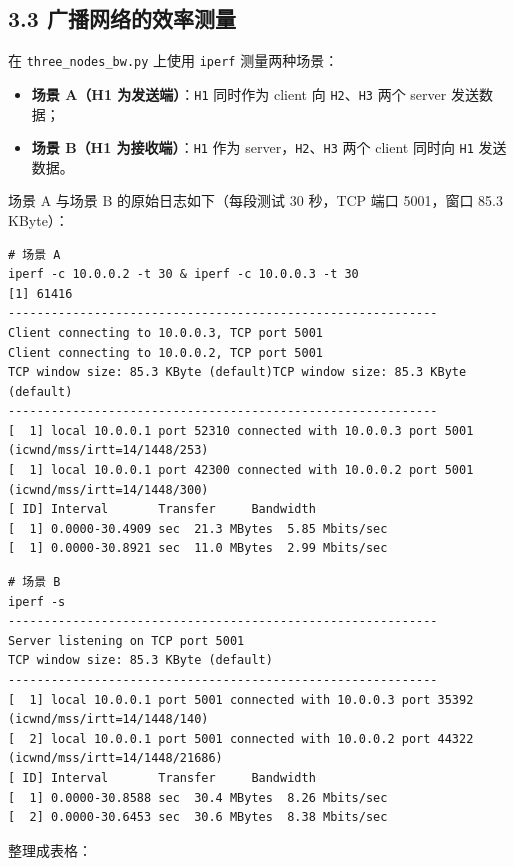 \documentclass[UTF8,12pt,a4paper,fontset=fandol]{ctexart}
\begin{document}
\subsection*{3.3 广播网络的效率测量}

在 \texttt{three_nodes_bw.py} 上使用 \texttt{iperf} 测量两种场景：

\begin{itemize}[leftmargin=1.7em]
  \item \textbf{场景 A（H1 为发送端）}：\texttt{H1} 同时作为 client 向 \texttt{H2}、\texttt{H3} 两个 server 发送数据；
  \item \textbf{场景 B（H1 为接收端）}：\texttt{H1} 作为 server，\texttt{H2}、\texttt{H3} 两个 client 同时向 \texttt{H1} 发送数据。
\end{itemize}

场景 A 与场景 B 的原始日志如下（每段测试 30 秒，TCP 端口 5001，窗口 85.3 KByte）：

\begin{verbatim}
# 场景 A
iperf -c 10.0.0.2 -t 30 & iperf -c 10.0.0.3 -t 30
[1] 61416
------------------------------------------------------------
Client connecting to 10.0.0.3, TCP port 5001
Client connecting to 10.0.0.2, TCP port 5001
TCP window size: 85.3 KByte (default)TCP window size: 85.3 KByte (default)
------------------------------------------------------------
[  1] local 10.0.0.1 port 52310 connected with 10.0.0.3 port 5001 (icwnd/mss/irtt=14/1448/253)
[  1] local 10.0.0.1 port 42300 connected with 10.0.0.2 port 5001 (icwnd/mss/irtt=14/1448/300)
[ ID] Interval       Transfer     Bandwidth
[  1] 0.0000-30.4909 sec  21.3 MBytes  5.85 Mbits/sec
[  1] 0.0000-30.8921 sec  11.0 MBytes  2.99 Mbits/sec
\end{verbatim}

\begin{verbatim}
# 场景 B
iperf -s
------------------------------------------------------------
Server listening on TCP port 5001
TCP window size: 85.3 KByte (default)
------------------------------------------------------------
[  1] local 10.0.0.1 port 5001 connected with 10.0.0.3 port 35392 (icwnd/mss/irtt=14/1448/140)
[  2] local 10.0.0.1 port 5001 connected with 10.0.0.2 port 44322 (icwnd/mss/irtt=14/1448/21686)
[ ID] Interval       Transfer     Bandwidth
[  1] 0.0000-30.8588 sec  30.4 MBytes  8.26 Mbits/sec
[  2] 0.0000-30.6453 sec  30.6 MBytes  8.38 Mbits/sec
\end{verbatim}

整理成表格：
\end{document}
